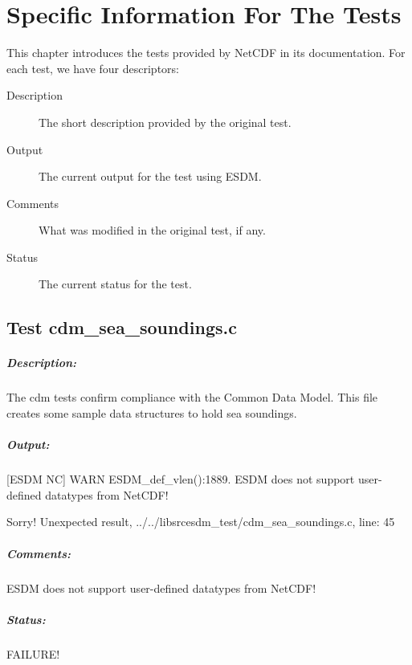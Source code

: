 \chapter{Specific Information For The Tests}

\tab
This chapter introduces the tests provided by NetCDF in its documentation. For each test, we have four descriptors:

\begin{description}

\item[Description] The short description provided by the original test.

\item[Output] The current output for the test using ESDM.

\item[Comments] What was modified in the original test, if any.

\item[Status] The current status for the test.

\end{description}

\section{Test cdm\_sea\_soundings.c}

\paragraph{Description:} The cdm tests confirm compliance with the Common Data Model. This file creates some sample data structures to hold sea soundings.

\paragraph{Output:} [ESDM NC] WARN ESDM\_def\_vlen():1889. ESDM does not support user-defined datatypes from NetCDF!

Sorry! Unexpected result, ../../libsrcesdm\_test/cdm\_sea\_soundings.c, line: 45

\paragraph{Comments:} ESDM does not support user-defined datatypes from NetCDF!

\paragraph{Status:} FAILURE!

